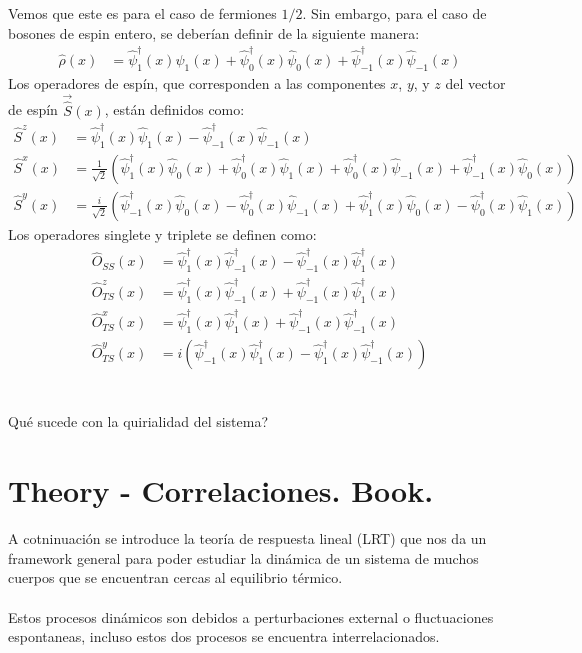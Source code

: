 Vemos que este es para el caso de fermiones $1/2$. Sin embargo, para el caso de bosones de espin entero, se deberían definir de la siguiente manera:
\begin{align*}
\hat{\rho}(x) &= \hat{\psi}_{1}^{\dagger}(x) \hat{\psi}_{1}(x) + \hat{\psi}_{0}^{\dagger}(x) \hat{\psi}_{0}(x) + \hat{\psi}_{-1}^{\dagger}(x) \hat{\psi}_{-1}(x)
\end{align*}
Los operadores de espín, que corresponden a las componentes \(x\), \(y\), y \(z\) del vector de espín \(\vec{\hat{S}}(x)\), están definidos como:
\begin{align*}
\hat{S}^z(x) &= \hat{\psi}_{1}^{\dagger}(x) \hat{\psi}_{1}(x) - \hat{\psi}_{-1}^{\dagger}(x) \hat{\psi}_{-1}(x)
\\
\hat{S}^x(x) &= \frac{1}{\sqrt{2}} \left( \hat{\psi}_{1}^{\dagger}(x) \hat{\psi}_{0}(x) + \hat{\psi}_{0}^{\dagger}(x) \hat{\psi}_{1}(x) + \hat{\psi}_{0}^{\dagger}(x) \hat{\psi}_{-1}(x) + \hat{\psi}_{-1}^{\dagger}(x) \hat{\psi}_{0}(x) \right)
\\
\hat{S}^y(x) &= \frac{i}{\sqrt{2}} \left( \hat{\psi}_{-1}^{\dagger}(x) \hat{\psi}_{0}(x) - \hat{\psi}_{0}^{\dagger}(x) \hat{\psi}_{-1}(x) + \hat{\psi}_{1}^{\dagger}(x) \hat{\psi}_{0}(x) - \hat{\psi}_{0}^{\dagger}(x) \hat{\psi}_{1}(x) \right)
\end{align*}
Los operadores singlete y triplete se definen como:
\begin{align*}
\hat{O}_{SS}(x) &= \hat{\psi}_{1}^{\dagger}(x) \hat{\psi}_{-1}^{\dagger}(x) - \hat{\psi}_{-1}^{\dagger}(x) \hat{\psi}_{1}^{\dagger}(x)
\\
\hat{O}_{TS}^z(x) &= \hat{\psi}_{1}^{\dagger}(x) \hat{\psi}_{-1}^{\dagger}(x) + \hat{\psi}_{-1}^{\dagger}(x) \hat{\psi}_{1}^{\dagger}(x)
\\
\hat{O}_{TS}^x(x) &= \hat{\psi}_{1}^{\dagger}(x) \hat{\psi}_{1}^{\dagger}(x) + \hat{\psi}_{-1}^{\dagger}(x) \hat{\psi}_{-1}^{\dagger}(x)
\\
\hat{O}_{TS}^y(x) &= i \left( \hat{\psi}_{-1}^{\dagger}(x) \hat{\psi}_{1}^{\dagger}(x) - \hat{\psi}_{1}^{\dagger}(x) \hat{\psi}_{-1}^{\dagger}(x) \right)
\end{align*} \\ \\




\textcolor{myred}{Qué sucede con la quirialidad del sistema?}


\newpage
\section{Theory - Correlaciones. Book.}
A cotninuación se introduce la teoría de respuesta lineal (LRT) que nos da un framework general para poder estudiar la dinámica de un sistema de muchos cuerpos que se encuentran cercas al equilibrio térmico.\\ \\
Estos procesos dinámicos son debidos a perturbaciones external o fluctuaciones espontaneas, incluso estos dos procesos se encuentra interrelacionados.
